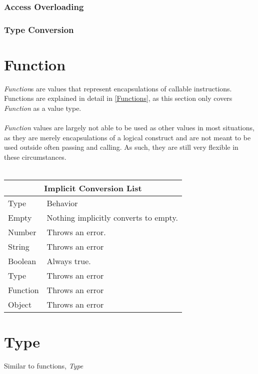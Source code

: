\documentclass[12pt,letterpaper]{report}
\begin{document}
\subsubsection{Access Overloading}\label{Access Overloading}
\subsubsection{Type Conversion}\label{Type Conversion}



\section{Function}\label{Function}

\textit{Function}s are values that represent encapsulations of callable instructions. Functions are
explained in detail in \autoref{Functions}, as this section only covers \textit{Function} as 
a value type.
\\\\
\textit{Function} values are largely not able to be used as other values in most situations, as 
they are merely encapsulations of a logical construct and are not meant to be used outside often
passing and calling. As such, they are still very flexible in these circumstances.
\\\\
{
\centering
\begin{tabular}{ |p{2.5cm}||p{10cm}|  }
  \hline
  \multicolumn{2}{|c|}{Implicit Conversion List} \\
  \hline
  Type & Behavior\\
  \hline
  Empty & Nothing implicitly converts to empty.\\
  Number  & Throws an error. \\
  String & Throws an error\\
  Boolean & Always true. \\
  Type & Throws an error\\
  Function & Throws an error\\
  Object & Throws an error\\
 \hline
\end{tabular}
}

\section{Type}\label{Type}

Similar to functions, \textit{Type}
\end{document}
